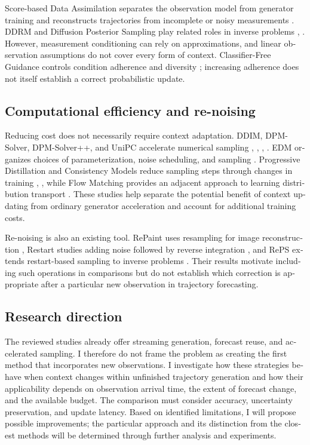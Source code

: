 \documentclass{article}
\begin{document}
\begin{otherlanguage}{english}
Score-based Data Assimilation separates the observation model from generator training and reconstructs trajectories from incomplete or noisy measurements \citep{p22}. DDRM and Diffusion Posterior Sampling play related roles in inverse problems \citep{p29}, \citep{p28}. However, measurement conditioning can rely on approximations, and linear observation assumptions do not cover every form of context. Classifier-Free Guidance controls condition adherence and diversity \citep{p40}; increasing adherence does not itself establish a correct probabilistic update.

\subsection{Computational efficiency and re-noising}

Reducing cost does not necessarily require context adaptation. DDIM, DPM-Solver, DPM-Solver++, and UniPC accelerate numerical sampling \citep{p30}, \citep{p31}, \citep{p32}, \citep{p33}. EDM organizes choices of parameterization, noise scheduling, and sampling \citep{p36}. Progressive Distillation and Consistency Models reduce sampling steps through changes in training \citep{p35}, \citep{p34}, while Flow Matching provides an adjacent approach to learning distribution transport \citep{p39}. These studies help separate the potential benefit of context updating from ordinary generator acceleration and account for additional training costs.

Re-noising is also an existing tool. RePaint uses resampling for image reconstruction \citep{p27}, Restart studies adding noise followed by reverse integration \citep{p25}, and RePS extends restart-based sampling to inverse problems \citep{p26}. Their results motivate including such operations in comparisons but do not establish which correction is appropriate after a particular new observation in trajectory forecasting.

\subsection{Research direction}

The reviewed studies already offer streaming generation, forecast reuse, and accelerated sampling. I therefore do not frame the problem as creating the first method that incorporates new observations. I investigate how these strategies behave when context changes within unfinished trajectory generation and how their applicability depends on observation arrival time, the extent of forecast change, and the available budget. The comparison must consider accuracy, uncertainty preservation, and update latency. Based on identified limitations, I will propose possible improvements; the particular approach and its distinction from the closest methods will be determined through further analysis and experiments.
\end{otherlanguage}

\clearpage


\end{document}
